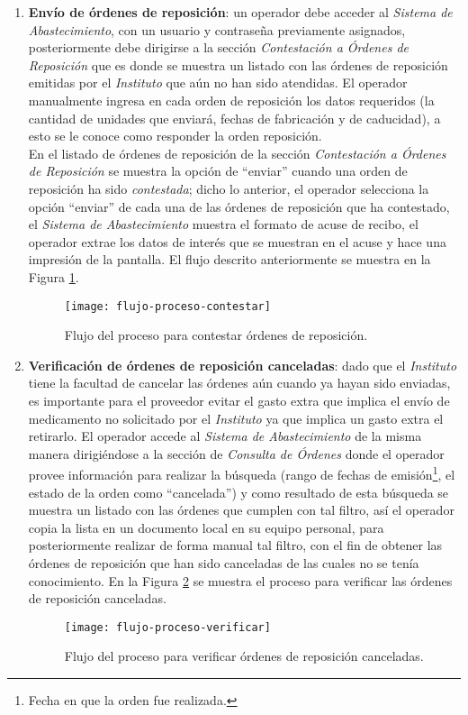 \begin{enumerate}
\item \textbf{Envío de órdenes de reposición}: un operador debe acceder al \textit{Sistema de Abastecimiento}, con un usuario y contraseña previamente asignados, posteriormente debe dirigirse a la sección \textit{Contestación a Órdenes de Reposición} que es donde se muestra un listado con las órdenes de reposición emitidas por el \textit{Instituto} que aún no han sido atendidas. El operador manualmente ingresa en cada orden de reposición los datos requeridos (la cantidad de unidades que enviará, fechas de fabricación y de caducidad), a esto se le conoce como responder la orden reposición.\\
En el listado de órdenes de reposición de la sección \textit{Contestación a Órdenes de Reposición} se muestra la opción de ``enviar'' cuando una orden de reposición ha sido \textit{contestada}; dicho lo anterior, el operador selecciona la opción ``enviar'' de cada una de las órdenes de reposición que ha contestado, el \textit{Sistema de Abastecimiento} muestra el formato de acuse de recibo, el operador extrae los datos de interés que se muestran en el acuse y hace una impresión de la pantalla. El flujo descrito anteriormente se muestra en la Figura \ref{fig:flow-proc-contestar}.

\begin{figure}[H]
\centering
\texttt{[image: flujo-proceso-contestar]} 
\caption{Flujo del proceso para contestar órdenes de reposición.}
\label{fig:flow-proc-contestar}
\end{figure}

\item \textbf{Verificación de órdenes de reposición canceladas}: dado que el \textit{Instituto} tiene la facultad de cancelar las órdenes aún cuando ya hayan sido enviadas, es importante para el proveedor evitar el gasto extra que implica el envío de medicamento no solicitado por el \textit{Instituto} ya que implica un gasto extra el retirarlo. El operador accede al \textit{Sistema de Abastecimiento} de la misma manera dirigiéndose a la sección de \textit{Consulta de Órdenes} donde el operador provee información para realizar la búsqueda (rango de fechas de emisión\footnote{Fecha en que la orden fue realizada.}, el estado de la orden como ``cancelada'') y como resultado de esta búsqueda se muestra un listado con las órdenes que cumplen con tal filtro, así el operador copia la lista en un documento local en su equipo personal, para posteriormente realizar de forma manual tal filtro, con el fin de obtener las órdenes de reposición que han sido canceladas de las cuales no se tenía conocimiento. En la Figura \ref{fig:flow-proc-verificar} se muestra el proceso para verificar las órdenes de reposición canceladas.
\begin{figure}[H]
\centering
\texttt{[image: flujo-proceso-verificar]} 
\caption{Flujo del proceso para verificar órdenes de reposición canceladas.}
\label{fig:flow-proc-verificar}
\end{figure}
\end{enumerate}

